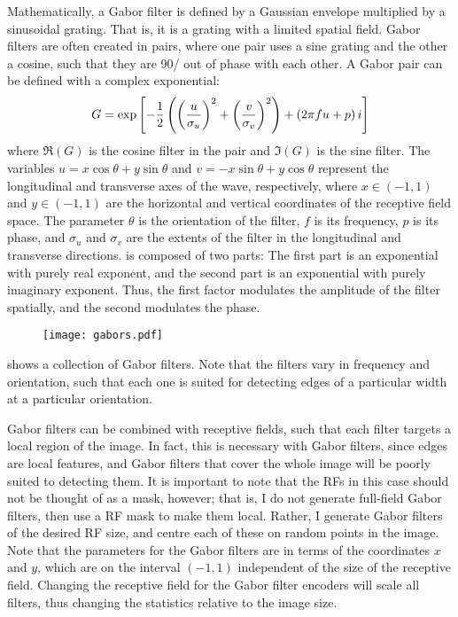 Mathematically, a Gabor filter is defined by a Gaussian envelope
multiplied by a sinusoidal grating.
That is, it is a grating with a limited spatial field.
Gabor filters are often created in pairs,
where one pair uses a sine grating and the other a cosine,
such that they are 90\degree/ out of phase with each other.
A Gabor pair can be defined with a complex exponential:
\begin{align}
  G = \exp\left[
    -\frac{1}{2} \left(\left(\frac{u}{\sigma_u}\right)^2 +
                       \left(\frac{v}{\sigma_v}\right)^2\right)
    + \left(2 \pi f u + p\right) i \right]
  \eqnlabel{gabor}
\end{align}
where $\Re(G)$ is the cosine filter in the pair
and $\Im(G)$ is the sine filter.
The variables
$u = x\cos\theta + y\sin\theta$ and $v = -x\sin\theta + y\cos\theta$
represent the longitudinal and transverse axes of the wave, respectively,
where $x \in (-1, 1)$ and $y \in (-1, 1)$ are the
horizontal and vertical coordinates of the receptive field space.
The parameter $\theta$ is the orientation of the filter,
$f$ is its frequency, $p$ is its phase,
and $\sigma_u$ and $\sigma_v$ are the extents of the filter
in the longitudinal and transverse directions.
 is composed of two parts:
The first part is an exponential with purely real exponent,
and the second part is an exponential with purely imaginary exponent.
Thus, the first factor modulates the amplitude of the filter spatially,
and the second modulates the phase.

\begin{figure}
  \centering
  \texttt{[image: gabors.pdf]}
\end{figure}

 shows a collection of Gabor filters.
Note that the filters vary in frequency and orientation,
such that each one is suited for detecting edges of a particular width
at a particular orientation.

Gabor filters can be combined with receptive fields,
such that each filter targets a local region of the image.
In fact, this is necessary with Gabor filters,
since edges are local features,
and Gabor filters that cover the whole image will be poorly suited
to detecting them.
It is important to note that the RFs in this case should not be thought of
as a mask, however;
that is, I do not generate full-field Gabor filters,
then use a RF mask to make them local.
Rather, I generate Gabor filters of the desired RF size,
and centre each of these on random points in the image.
Note that the parameters for the Gabor filters are in terms of the coordinates
$x$ and $y$,
which are on the interval $(-1, 1)$
independent of the size of the receptive field.
Changing the receptive field for the Gabor filter encoders
will scale all filters,
thus changing the statistics relative to the image size.


